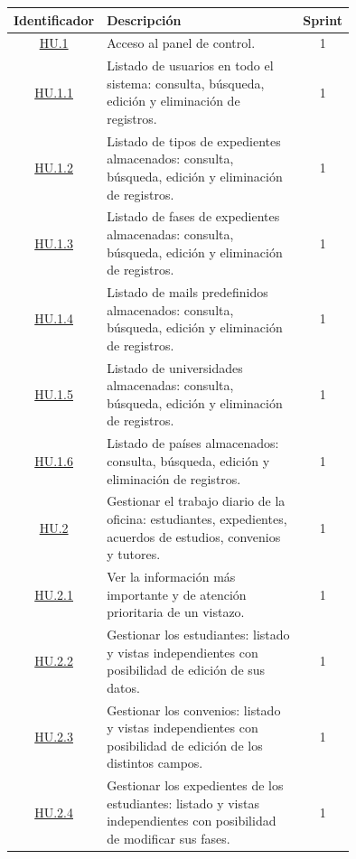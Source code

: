 \begin{table}[H]
	\begin{center}
		\begin{adjustbox}{width=1\textwidth}
			\begin{tabular}{ | c | >{\centering\arraybackslash}p{0.75\linewidth} | c | } 
				\hline
					\textbf{Identificador} & \textbf{Descripción} & \textbf{Sprint} \\
				\hline
					\hyperref[tab:HU1]{HU.1} &  Acceso al panel de control. & 1 \\
				\hline
					\hyperref[tab:HU1.1]{HU.1.1} & Listado de usuarios en todo el sistema: consulta, búsqueda, edición y eliminación de registros. & 1 \\
				\hline
					\hyperref[tab:HU1.2]{HU.1.2} & Listado de tipos de expedientes almacenados: consulta, búsqueda, edición y eliminación de registros. & 1 \\
				\hline
					\hyperref[tab:HU1.3]{HU.1.3} & Listado de fases de expedientes almacenadas: consulta, búsqueda, edición y eliminación de registros. & 1 \\
				\hline
					\hyperref[tab:HU1.4]{HU.1.4} & Listado de mails predefinidos almacenados: consulta, búsqueda, edición y eliminación de registros. & 1 \\
				\hline
					\hyperref[tab:HU1.5]{HU.1.5} & Listado de universidades almacenadas: consulta, búsqueda, edición y eliminación de registros. & 1 \\
				\hline
					\hyperref[tab:HU1.6]{HU.1.6} & Listado de países almacenados: consulta, búsqueda, edición y eliminación de registros. & 1 \\
				\hline
					\hyperref[tab:HU2]{HU.2} & Gestionar el trabajo diario de la oficina: estudiantes, expedientes, acuerdos de estudios, convenios y tutores. & 1 \\
				\hline
					\hyperref[tab:HU2.1]{HU.2.1} & Ver la información más importante y de atención prioritaria de un vistazo. & 1 \\
				\hline
					\hyperref[tab:HU2.2]{HU.2.2} & Gestionar los estudiantes: listado y vistas independientes con posibilidad de edición de sus datos. & 1 \\
				\hline
					\hyperref[tab:HU2.3]{HU.2.3} & Gestionar los convenios: listado y vistas independientes con posibilidad de edición de los distintos campos. & 1 \\
				\hline
					\hyperref[tab:HU2.4]{HU.2.4} & Gestionar los expedientes de los estudiantes: listado y vistas independientes con posibilidad de modificar sus fases. & 1 \\

\end{tabular}
\end{adjustbox}
\end{center}
\end{table}
